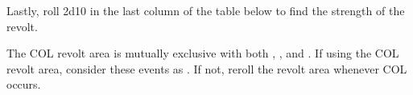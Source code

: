 \aparag Lastly, roll 2d10 in the last column of the table below to find the
strength of the revolt.





\newcommand{\ANGrev}{\ANG} \newcommand{\AUSrev}{\AUS}
\newcommand{\DANrev}{\DAN} \newcommand{\FRArev}{\FRA}
\newcommand{\HISrev}{\HIS} \newcommand{\HOLrev}{\HOL}
\newcommand{\POLrev}{\POL} \newcommand{\PORrev}{\POR}
\newcommand{\PRUrev}{\PRU} \newcommand{\ROTWrev}{COL\xspace}
\newcommand{\RUSrev}{\RUS} \newcommand{\SUErev}{\SUE}
\newcommand{\TURrev}{\TUR} \newcommand{\VENrev}{\VEN}

\begin{designnote}
  The \ROTWrev revolt area is mutually exclusive with both
  , ,
   and . If
  using the \ROTWrev revolt area, consider these events as \RD. If not, reroll
  the revolt area whenever \ROTWrev occurs.
\end{designnote}

